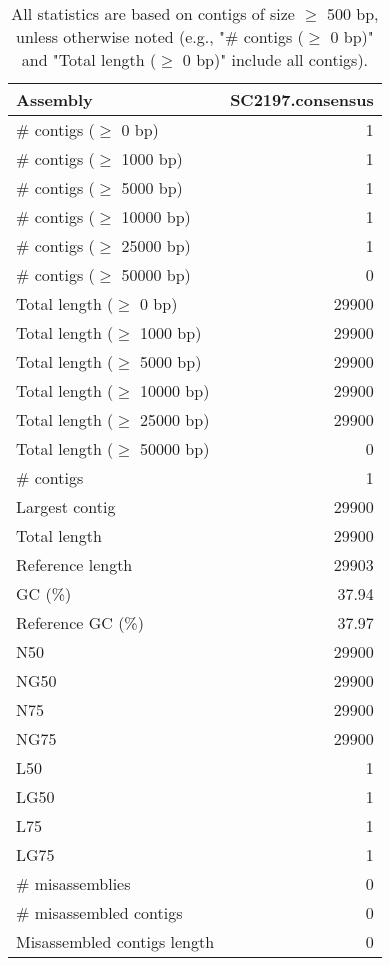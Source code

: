 \documentclass[12pt,a4paper]{article}
\begin{document}
\begin{table}[ht]
\begin{center}
\caption{All statistics are based on contigs of size $\geq$ 500 bp, unless otherwise noted (e.g., "\# contigs ($\geq$ 0 bp)" and "Total length ($\geq$ 0 bp)" include all contigs).}
\begin{tabular}{|l*{1}{|r}|}
\hline
Assembly & SC2197.consensus \\ \hline
\# contigs ($\geq$ 0 bp) & 1 \\ \hline
\# contigs ($\geq$ 1000 bp) & 1 \\ \hline
\# contigs ($\geq$ 5000 bp) & 1 \\ \hline
\# contigs ($\geq$ 10000 bp) & 1 \\ \hline
\# contigs ($\geq$ 25000 bp) & 1 \\ \hline
\# contigs ($\geq$ 50000 bp) & 0 \\ \hline
Total length ($\geq$ 0 bp) & 29900 \\ \hline
Total length ($\geq$ 1000 bp) & 29900 \\ \hline
Total length ($\geq$ 5000 bp) & 29900 \\ \hline
Total length ($\geq$ 10000 bp) & 29900 \\ \hline
Total length ($\geq$ 25000 bp) & 29900 \\ \hline
Total length ($\geq$ 50000 bp) & 0 \\ \hline
\# contigs & 1 \\ \hline
Largest contig & 29900 \\ \hline
Total length & 29900 \\ \hline
Reference length & 29903 \\ \hline
GC (\%) & 37.94 \\ \hline
Reference GC (\%) & 37.97 \\ \hline
N50 & 29900 \\ \hline
NG50 & 29900 \\ \hline
N75 & 29900 \\ \hline
NG75 & 29900 \\ \hline
L50 & 1 \\ \hline
LG50 & 1 \\ \hline
L75 & 1 \\ \hline
LG75 & 1 \\ \hline
\# misassemblies & 0 \\ \hline
\# misassembled contigs & 0 \\ \hline
Misassembled contigs length & 0 \\ \hline

\end{tabular}
\end{center}
\end{table}
\end{document}
